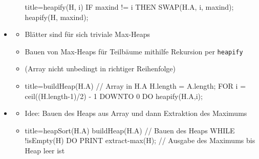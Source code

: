 \documentclass[
    12pt,
    a4paper,
    ngerman,
    color=3b,%
    marginpar=false,
    colorback=false,
    leqno,
]{tudaexercise}
\begin{document}
\begin{itemize}
\begin{itemize}
\begin{ccode}[autogobble]{title={heapify(H, i)}}
                    IF maxind != i THEN
                        SWAP(H.A, i, maxind);
                        heapify(H, maxind);
                    \end{ccode}
            \end{itemize}

        \item {}
            \begin{itemize}
                \item Blätter sind für sich triviale Max-Heaps
                \item Bauen von Max-Heaps für Teilbäume mithilfe Rekursion per \texttt{heapify} 
                \item (Array nicht unbedingt in richtiger Reihenfolge)
                \item[]
                    \begin{ccode}[autogobble]{title={buildHeap(H.A) // Array in H.A}}
                    H.length = A.length;
                    FOR i = ceil((H.length-1)/2) - 1 DOWNTO 0 DO
                        heapify(H.A,i);
                    \end{ccode}
            \end{itemize}

        \item {}
            \begin{itemize}
                \item Idee: Bauen des Heaps aus Array und dann Extraktion des Maximums
                \item[]
                    \begin{ccode}[autogobble]{title={heapSort(H.A)}}
                    buildHeap(H.A)                  // Bauen des Heaps
                    WHILE !isEmpty(H) DO
                        PRINT extract-max(H);       // Ausgabe des Maximums bis Heap leer ist
                    \end{ccode}
            \end{itemize}
    \end{itemize}
    \clearpage
\end{document}
